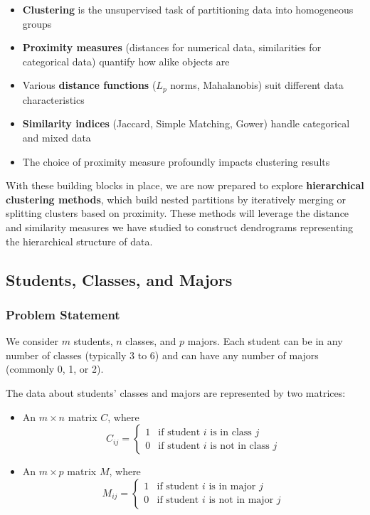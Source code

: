 \documentclass[11pt]{article}
\begin{document}
\begin{itemize}
    \item \textbf{Clustering} is the unsupervised task of partitioning data into homogeneous groups
    \item \textbf{Proximity measures} (distances for numerical data, similarities for categorical data) quantify how alike objects are
    \item Various \textbf{distance functions} ($L_p$ norms, Mahalanobis) suit different data characteristics
    \item \textbf{Similarity indices} (Jaccard, Simple Matching, Gower) handle categorical and mixed data
    \item The choice of proximity measure profoundly impacts clustering results
\end{itemize}

With these building blocks in place, we are now prepared to explore \textbf{hierarchical clustering methods}, which build nested partitions by iteratively merging or splitting clusters based on proximity. These methods will leverage the distance and similarity measures we have studied to construct dendrograms representing the hierarchical structure of data.




\subsection{Students, Classes, and Majors}

\subsubsection{Problem Statement}

We consider $m$ students, $n$ classes, and $p$ majors. Each student can be in any number of classes (typically 3 to 6) and can have any number of majors (commonly 0, 1, or 2). 

The data about students' classes and majors are represented by two matrices:
\begin{itemize}
    \item An $m \times n$ matrix $C$, where
    \[
    C_{ij} = \begin{cases}
    1 & \text{if student } i \text{ is in class } j \\
    0 & \text{if student } i \text{ is not in class } j
    \end{cases}
    \]
    
    \item An $m \times p$ matrix $M$, where
    \[
    M_{ij} = \begin{cases}

    1 & \text{if student } i \text{ is in major } j \\
    0 & \text{if student } i \text{ is not in major } j
    \end{cases}
    \]
\end{itemize}
\end{document}
